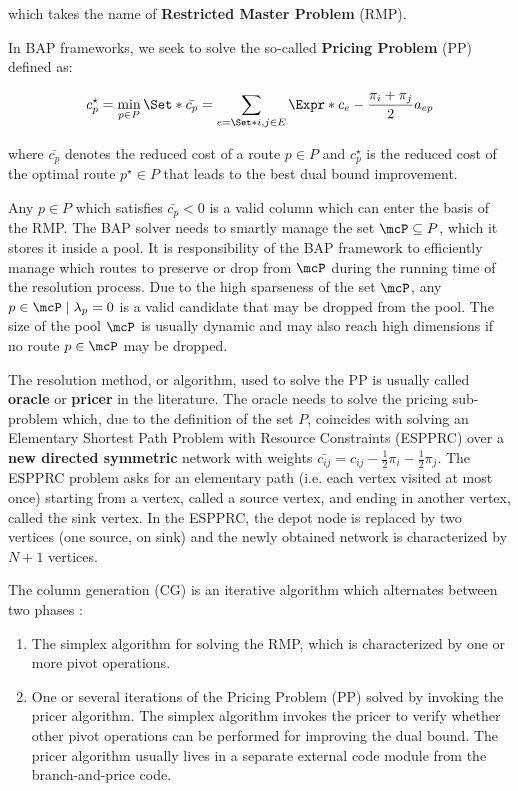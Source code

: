 which takes the name of \textbf{Restricted Master Problem} (RMP).

In BAP frameworks, we seek to solve the so-called \textbf{Pricing Problem} (PP) defined as:

\begin{equation}
	{c^\star_p} = \min_{p \in P} \Set*{ \bar{c_p} = \sum_{e = \Set*{i, j} \in E} \Expr*{c_{e} - \frac{\pi_i + \pi_j}{2}} a_{ep}  }
\end{equation}

where $\bar{c_p}$ denotes the reduced cost of a route $p \in P$
and $c^\star_p$ is the reduced cost of the optimal route $p^\star \in P$
that leads to the best dual bound improvement.

Any $p \in P$ which satisfies $\bar{c_p} < 0$ is a valid column which can enter the basis of the RMP.
The BAP solver needs to smartly manage the set $\mcP \subseteq P$, which it stores it inside a pool.
It is responsibility of the BAP framework to efficiently manage which routes
to preserve or drop from $\mcP$ during the running time of the resolution process.
Due to the high sparseness of the set $\mcP$, any $p \in \mcP \mid \lambda_p = 0$
is a valid candidate that may be dropped from the pool.
The size of the pool $\mcP$ is usually dynamic and may also reach high dimensions
if no route $p \in \mcP$ may be dropped.

\medskip

The resolution method, or algorithm,
used to solve the PP is usually called \textbf{oracle} or \textbf{pricer} in the literature.
The oracle needs to solve the pricing sub-problem which, due to the definition of the set $P$,
coincides with solving an Elementary Shortest Path Problem with Resource Constraints (ESPPRC)
over a \textbf{new directed symmetric} network with weights
$\bar{c_{ij}} = c_{ij} - \frac{1}{2} \pi_i - \frac{1}{2} \pi_j$.
The ESPPRC problem asks for an elementary path (i.e. each vertex visited at most once) starting
from a vertex, called a source vertex, and ending in another vertex, called the sink vertex.
In the ESPPRC, the depot node is replaced by two vertices (one source, on sink)
and the newly obtained network is characterized by $N + 1$ vertices.

\medskip

The column generation (CG) is an iterative algorithm which alternates between two phases \parencite{desaulniers2018}:
\begin{enumerate}
	\item The simplex algorithm for solving the RMP, which is characterized by one or more pivot operations.
	\item One or several iterations of the Pricing Problem (PP) solved by invoking the pricer algorithm.
	      The simplex algorithm invokes the pricer to verify whether other pivot operations
	      can be performed for improving the dual bound.
	      The pricer algorithm usually lives in a separate external code module from the branch-and-price code.
\end{enumerate}

